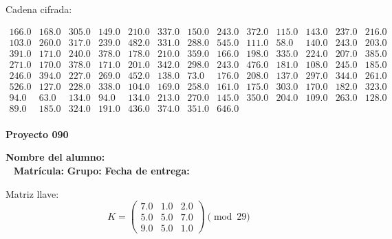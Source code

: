 \documentclass[12pt]{article}
\begin{document}
Cadena cifrada:
\begin{center}
$\begin{array}{lllllllllllll}
166.0 & 168.0 & 305.0 & 149.0 & 210.0 & 337.0 & 150.0 & 243.0 & 372.0 & 115.0 & 143.0 & 237.0 & 216.0\\
103.0 & 260.0 & 317.0 & 239.0 & 482.0 & 331.0 & 288.0 & 545.0 & 111.0 & 58.0 & 140.0 & 243.0 & 203.0\\
391.0 & 171.0 & 240.0 & 378.0 & 178.0 & 210.0 & 359.0 & 166.0 & 198.0 & 335.0 & 224.0 & 207.0 & 385.0\\
271.0 & 170.0 & 378.0 & 171.0 & 201.0 & 342.0 & 298.0 & 243.0 & 476.0 & 181.0 & 108.0 & 245.0 & 185.0\\
246.0 & 394.0 & 227.0 & 269.0 & 452.0 & 138.0 & 73.0 & 176.0 & 208.0 & 137.0 & 297.0 & 344.0 & 261.0\\
526.0 & 127.0 & 228.0 & 338.0 & 104.0 & 169.0 & 258.0 & 161.0 & 175.0 & 303.0 & 170.0 & 182.0 & 323.0\\
94.0 & 63.0 & 134.0 & 94.0 & 134.0 & 213.0 & 270.0 & 145.0 & 350.0 & 204.0 & 109.0 & 263.0 & 128.0\\
89.0 & 185.0 & 324.0 & 191.0 & 436.0 & 374.0 & 351.0 & 646.0\\
\end{array}$
\end{center}

\newpage


\textbf{Proyecto 090}

\textbf{Nombre del alumno:} \underline{\hspace{13cm}}\\\
\vspace{1cm}
\textbf{Matrícula:} \underline{\hspace{4cm}} \hspace{1cm}
\textbf{Grupo:} \underline{\hspace{2cm}}
\textbf{Fecha de entrega:} \underline{\hspace{2cm}}

\medskip

Matriz llave:
\[
K = \begin{pmatrix}
7.0 & 1.0 & 2.0\\
5.0 & 5.0 & 7.0\\
9.0 & 5.0 & 1.0
\end{pmatrix} \pmod{29}
\]
\end{document}
